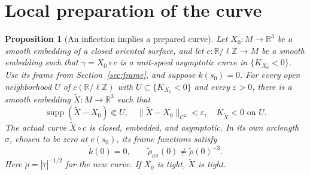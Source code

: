 \documentclass[11pt]{amsart}
\newtheorem{proposition}[theorem]{Proposition}
\theoremstyle{definition}
\newcommand{\R}{\mathbb R}
\DeclareMathOperator{\supp}{supp}
\begin{document}
\section{Local preparation of the curve}\label{sec:preparation}

\begin{proposition}[An inflection implies a prepared curve]
\label{prop:prepare}
Let $X_0:M\to\R^3$ be a smooth embedding of a closed oriented
surface, and let $c:\R/\ell\mathbb Z\to M$ be a smooth embedding
such that $\gamma=X_0\circ c$ is a unit-speed asymptotic curve
in $\{K_{X_0}<0\}$. Use its frame from
Section~\ref{sec:frame}, and suppose $k(s_0)=0$.
For every open neighborhood $U$ of $c(\R/\ell\mathbb Z)$ with
$U\subset\{K_{X_0}<0\}$ and every $\varepsilon>0$, there is a
smooth embedding $\widetilde X:M\to\R^3$ such that
\[
 \supp(\widetilde X-X_0)\Subset U,\quad
 \|\widetilde X-X_0\|_{C^2}<\varepsilon,\quad
 K_{\widetilde X}<0\text{ on }U.
\]
The actual curve $\widetilde X\circ c$ is closed, embedded, and
asymptotic. In its own arclength $\sigma$, chosen to be zero at
$c(s_0)$, its frame functions satisfy
\begin{equation}\label{eq:prepared}
 \widetilde k(0)=0,\qquad
 \widetilde\rho_{\sigma\sigma}(0)\ne\widetilde\rho(0)^{-3}.
\end{equation}
Here $\widetilde\rho=|\widetilde\tau|^{-1/2}$ for the new curve.
If $X_0$ is tight, $\widetilde X$ is tight.
\end{proposition}
\end{document}
